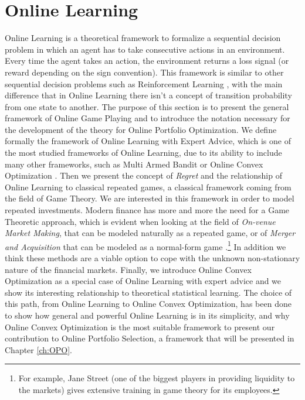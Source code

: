 \chapter{Online Learning}\label{ch:OnlineLearning}

Online Learning is a theoretical framework to formalize a sequential decision problem in which an agent has to take consecutive actions in an environment. Every time the agent takes an action, the environment returns a loss signal (or reward depending on the sign convention). This framework is similar to other sequential decision problems such as Reinforcement Learning \cite{sutton2018reinforcement}, with the main difference that in Online Learning there isn't a concept of transition probability from one state to another.
The purpose of this section is to present the general framework of Online Game Playing and to introduce the notation necessary for the development of the theory for Online Portfolio Optimization. We define formally the framework of Online Learning with Expert Advice, which is one of the most studied frameworks of Online Learning, due to its ability to include many other frameworks, such as Multi Armed Bandit \cite{bubeck2012regret} or Online Convex Optimization \cite{hazan2016introduction}.
Then we present the concept of \emph{Regret} and the relationship of Online Learning to classical repeated games, a classical framework coming from the field of Game Theory. 
We are interested in this framework in order to model repeated investments.
Modern finance has more and more the need for a Game Theoretic approach, which is evident when looking at the field of \emph{On-venue Market Making}, that can be modeled naturally as a repeated game, or of \emph{Merger and Acquisition} that can be modeled as a normal-form game \cite{Yanqing_MaA}.\footnote{For example, Jane Street (one of the biggest players in providing liquidity to the markets) gives extensive training in game theory for its employees.} In addition we think these methods are a viable option to cope with the unknown non-stationary nature of the financial markets.
Finally, we introduce Online Convex Optimization as a special case of Online Learning with expert advice and we show its interesting relationship to theoretical statistical learning. The choice of this path, from Online Learning to Online Convex Optimization, has been done to show how general and powerful Online Learning is in its simplicity, and why Online Convex Optimization is the most suitable framework to present our contribution to Online Portfolio Selection, a framework that will be presented in Chapter \ref{ch:OPO}.

